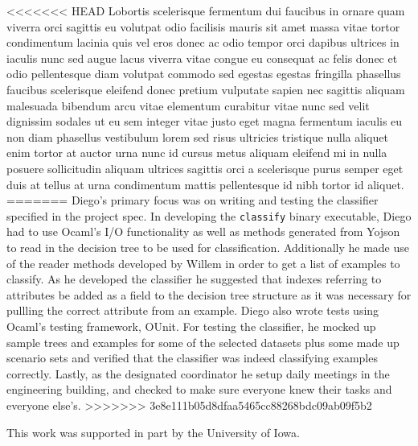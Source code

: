 \documentclass[screen, authorversion, nonacm, sigconf]{acmart}
\begin{document}
<<<<<<< HEAD
Lobortis scelerisque fermentum dui faucibus in ornare quam viverra orci sagittis eu volutpat odio facilisis mauris sit amet massa vitae tortor condimentum lacinia quis vel eros donec ac odio tempor orci dapibus ultrices in iaculis nunc sed augue lacus viverra vitae congue eu consequat ac felis donec et odio pellentesque diam volutpat commodo sed egestas egestas fringilla phasellus faucibus scelerisque eleifend donec pretium vulputate sapien nec sagittis aliquam malesuada bibendum arcu vitae elementum curabitur vitae nunc sed velit dignissim sodales ut eu sem integer vitae justo eget magna fermentum iaculis eu non diam phasellus vestibulum lorem sed risus ultricies tristique nulla aliquet enim tortor at auctor urna nunc id cursus metus aliquam eleifend mi in nulla posuere sollicitudin aliquam ultrices sagittis orci a scelerisque purus semper eget duis at tellus at urna condimentum mattis pellentesque id nibh tortor id aliquet.
=======
Diego's primary focus was on writing and testing the classifier specified in the project spec. In developing the \texttt{classify} binary executable, Diego had to use Ocaml's I/O functionality as well as methods generated from Yojson to read in the decision tree to be used for classification. Additionally he made use of the reader methods developed by Willem in order to get a list of examples to classify. As he developed the classifier he suggested that indexes referring to attributes be added as a field to the decision tree structure as it was necessary for pullling the correct attribute from an example. Diego also wrote tests using Ocaml's testing framework, OUnit. For testing the classifier, he mocked up sample trees and examples for some of the selected datasets plus some made up scenario sets and verified that the classifier was indeed classifying examples correctly. Lastly, as the designated coordinator he setup daily meetings in the engineering building, and checked to make sure everyone knew their tasks and everyone else's.
>>>>>>> 3e8e111b05d8dfaa5465cc88268bdc09ab09f5b2

\begin{acks}
This work was supported in part by the University of Iowa.
\end{acks}



\end{document}
